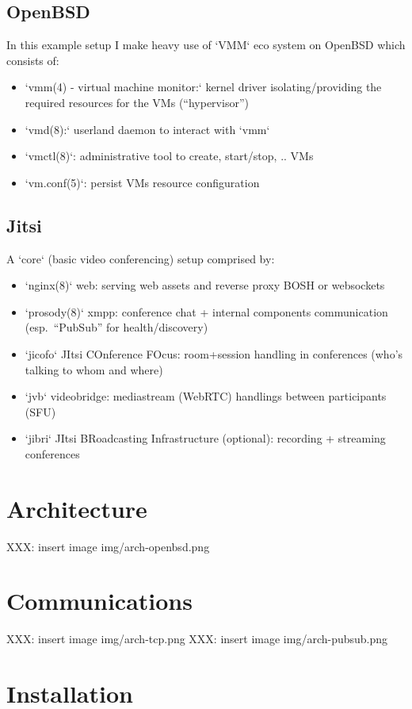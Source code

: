 \documentclass[conference]{IEEEtran}
\begin{document}
\subsection{OpenBSD}
In this example setup I make heavy use of `VMM` eco system on OpenBSD which consists of:
\begin{itemize}
\item `vmm(4) - virtual machine monitor:`
    kernel driver isolating/providing the required resources for the VMs (“hypervisor”) 
\item `vmd(8):`
	userland daemon to interact with `vmm`
\item `vmctl(8)`:
	administrative tool to create, start/stop, .. VMs 
\item `vm.conf(5)`:
	persist VMs resource configuration
\end{itemize}
\subsection{Jitsi}
A `core` (basic video conferencing) setup comprised by:
\begin{itemize}
\item `nginx(8)` web:
	serving web assets and reverse proxy BOSH or websockets
\item `prosody(8)` xmpp:
	conference chat + internal components communication (esp. “PubSub” for health/discovery)
\item `jicofo` JItsi COnference FOcus:
	room+session handling in conferences (who’s talking to whom and where)
\item `jvb` videobridge:
	mediastream (WebRTC) handlings between participants (SFU)
\item `jibri` JItsi BRoadcasting Infrastructure (optional):
	recording + streaming conferences
\end{itemize}

\section{Architecture}
XXX: insert image img/arch-openbsd.png
\section{Communications}
XXX: insert image img/arch-tcp.png
XXX: insert image img/arch-pubsub.png

\section{Installation}
\end{document}
